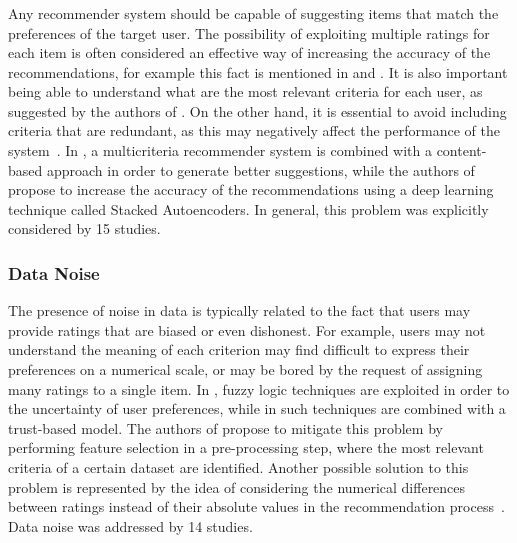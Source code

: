 \subsubsection{}
\label{mcr:sec:personalization}

Any recommender system should be capable of suggesting items that match the preferences of the target user. The possibility of exploiting multiple ratings for each item is often considered an effective way of increasing the accuracy of the recommendations, for example this fact is mentioned in  and . It is also important being able to understand what are the most relevant criteria for each user, as suggested by the authors of . On the other hand, it is essential to avoid including criteria that are redundant, as this may negatively affect the performance of the system~. In , a multicriteria recommender system is combined with a content-based approach in order to generate better suggestions, while the authors of  propose to increase the accuracy of the recommendations using a deep learning technique called Stacked Autoencoders. In general, this problem was explicitly considered by 15 studies.

\subsubsection{Data Noise}
\label{mcr:sec:data-noise}

The presence of noise in data is typically related to the fact that users may provide ratings that are biased or even dishonest. For example, users may not understand the meaning of each criterion  may find difficult to express their preferences on a numerical scale, or may be bored by the request of assigning many ratings to a single item. In , fuzzy logic techniques are exploited in order to  the uncertainty of user preferences, while in  such techniques are combined with a trust-based model. The authors of  propose to mitigate this problem by performing feature selection in a pre-processing step, where the most relevant criteria of a certain dataset are identified. Another possible solution to this problem is represented by the idea of considering the numerical differences between ratings instead of their absolute values in the recommendation process~. Data noise was addressed by 14 studies.

